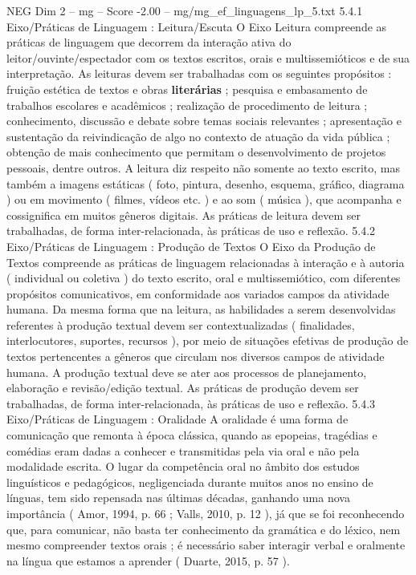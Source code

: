 \begin{textsample}{NEG Dim 2 – mg – Score -2.00 – mg/mg\_ef\_linguagens\_lp\_5.txt}  \label{ex:f2_neg_093}
5.4.1 Eixo/Práticas de Linguagem : Leitura/Escuta O Eixo Leitura compreende as práticas de linguagem que decorrem da interação ativa do leitor/ouvinte/espectador com os textos escritos, orais e multissemióticos e de sua interpretação.
As leituras devem ser trabalhadas com os seguintes propósitos : fruição estética de textos e obras \textbf{literárias} ; pesquisa e embasamento de trabalhos escolares e acadêmicos ; realização de procedimento de leitura ; conhecimento, discussão e debate sobre temas sociais relevantes ; apresentação e sustentação da reivindicação de algo no contexto de atuação da vida pública ; obtenção de mais conhecimento que permitam o desenvolvimento de projetos pessoais, dentre outros.
A leitura diz respeito não somente ao texto escrito, mas também a imagens estáticas ( foto, pintura, desenho, esquema, gráfico, diagrama ) ou em movimento ( filmes, vídeos etc. ) e ao som ( música ), que acompanha e cossignifica em muitos gêneros digitais.
As práticas de leitura devem ser trabalhadas, de forma inter-relacionada, às práticas de uso e reflexão. 5.4.2 Eixo/Práticas de Linguagem : Produção de Textos O Eixo da Produção de Textos compreende as práticas de linguagem relacionadas à interação e à autoria ( individual ou coletiva ) do texto escrito, oral e multissemiótico, com diferentes propósitos comunicativos, em conformidade aos variados campos da atividade humana.
Da mesma forma que na leitura, as habilidades a serem desenvolvidas referentes à produção textual devem ser contextualizadas ( finalidades, interlocutores, suportes, recursos ), por meio de situações efetivas de produção de textos pertencentes a gêneros que circulam nos diversos campos de atividade humana.
A produção textual deve se ater aos processos de planejamento, elaboração e revisão/edição textual.
As práticas de produção devem ser trabalhadas, de forma inter-relacionada, às práticas de uso e reflexão. 5.4.3 Eixo/Práticas de Linguagem : Oralidade A oralidade é uma forma de comunicação que remonta à época clássica, quando as epopeias, tragédias e comédias eram dadas a conhecer e transmitidas pela via oral e não pela modalidade escrita.
O lugar da competência oral no âmbito dos estudos linguísticos e pedagógicos, negligenciada durante muitos anos no ensino de línguas, tem sido repensada nas últimas décadas, ganhando uma nova importância ( Amor, 1994, p. 66 ; Valls, 2010, p. 12 ), já que se foi reconhecendo que, para comunicar, não basta ter conhecimento da gramática e do léxico, nem mesmo compreender textos orais ; é necessário saber interagir verbal e oralmente na língua que estamos a aprender ( Duarte, 2015, p. 57 ).

\end{textsample}
